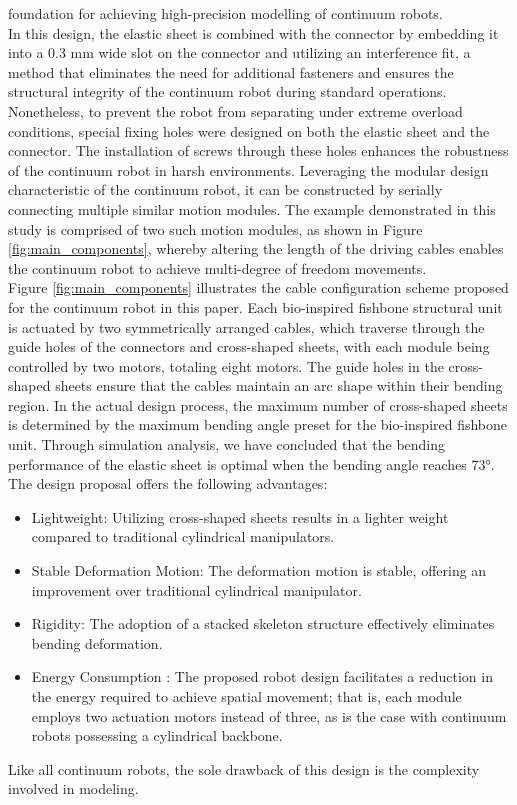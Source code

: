 foundation for achieving high-precision modelling of continuum robots. \\
In this design, the elastic sheet is combined with the connector by embedding it into a 0.3 mm wide slot on the connector 
and utilizing an interference fit, a method that eliminates the need for additional fasteners and ensures the structural 
integrity of the continuum robot during standard operations. Nonetheless, to prevent the robot from separating under 
extreme overload conditions, special fixing holes were designed on both the elastic sheet and the connector. The 
installation of screws through these holes enhances the robustness of the continuum robot in harsh environments. 
Leveraging the modular design characteristic of the continuum robot, it can be constructed by serially connecting 
multiple similar motion modules. The example demonstrated in this study is comprised of two such motion modules, as 
shown in Figure \ref{fig:main_components}, whereby altering the length of the driving cables enables the continuum 
robot to achieve multi-degree of freedom movements. \\
Figure \ref{fig:main_components} illustrates the cable configuration scheme proposed for the continuum robot in this 
paper. Each bio-inspired fishbone structural unit is actuated by two symmetrically arranged cables, which traverse 
through the guide holes of the connectors and cross-shaped sheets, with each module being controlled by two motors, 
totaling eight motors. The guide holes in the cross-shaped sheets ensure that the cables maintain an arc shape within 
their bending region. In the actual design process, the maximum number of cross-shaped sheets is determined by the 
maximum bending angle preset for the bio-inspired fishbone unit. Through simulation analysis, we have concluded that 
the bending performance of the elastic sheet is optimal when the bending angle reaches 73°. \\
The design proposal offers the following advantages: \\
\vspace{-10mm}
\begin{itemize}
    \item Lightweight: Utilizing cross-shaped sheets results in a lighter weight compared to traditional cylindrical manipulators.
    \item Stable Deformation Motion: The deformation motion is stable, offering an improvement over traditional cylindrical manipulator.
    \item Rigidity: The adoption of a stacked skeleton structure effectively eliminates bending deformation.
    \item Energy Consumption \cite{bio_noval_method}: The proposed robot design facilitates a reduction in the energy required to achieve spatial movement; that is, each module employs two actuation motors instead of three, as is the case with continuum robots possessing a cylindrical backbone.
\end{itemize}
Like all continuum robots, the sole drawback of this design is the complexity involved in modeling.
